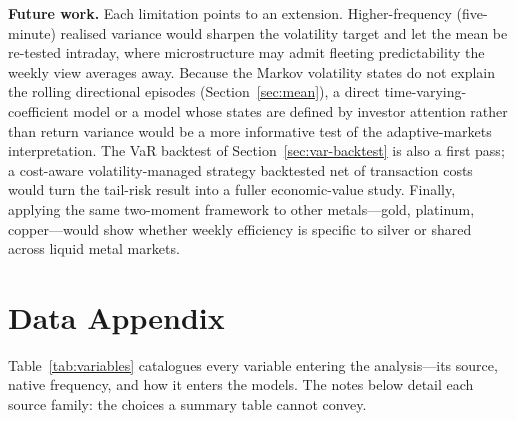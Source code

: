 \documentclass[12pt, a4paper]{article}
\begin{document}
\textbf{Future work.} Each limitation points to an extension. Higher-frequency (five-minute)
realised variance would sharpen the volatility target and let the mean be re-tested intraday,
where microstructure may admit fleeting predictability the weekly view averages away. Because
the Markov volatility states do not explain the rolling directional episodes
(Section~\ref{sec:mean}), a direct time-varying-coefficient model or a model whose states are
defined by investor attention rather than return variance would be a more informative test of
the adaptive-markets interpretation. The VaR backtest of Section~\ref{sec:var-backtest} is also a
first pass; a cost-aware volatility-managed strategy backtested net of transaction costs would
turn the tail-risk result into a fuller economic-value study. Finally, applying the same
two-moment framework to other metals---gold, platinum, copper---would show whether weekly
efficiency is specific to silver or shared across liquid metal markets.

\newpage
\printbibliography[heading=bibintoc]

\appendix

\section{Data Appendix}
\label{app:data}

Table~\ref{tab:variables} catalogues every variable entering the analysis---its source,
native frequency, and how it enters the models. The notes below detail each source family:
the choices a summary table cannot convey.
\end{document}
